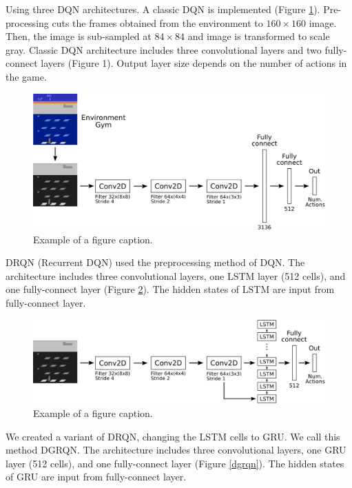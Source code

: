 \documentclass[conference]{IEEEtran}
\begin{document}
Using three DQN architectures. A classic DQN is implemented (Figure \ref{dqn}). Pre-processing cuts the frames obtained from the environment to $160\times160$ image. Then, the image is sub-sampled at $84\times84$ and image is transformed to scale gray. Classic DQN architecture includes three convolutional layers and two fully-connect layers (Figure 1). Output layer size depends on the number of actions in the game. 

\begin{figure}[htbp]
\centerline{\includegraphics[width=\linewidth]{images/DQN.png}}
\caption{Example of a figure caption.}
\label{dqn}
\end{figure}

DRQN (Recurrent DQN) used the preprocessing method of DQN. The architecture includes three convolutional layers, one LSTM layer (512 cells), and one fully-connect layer (Figure \ref{drqn}). The hidden states of LSTM are input from fully-connect layer.

\begin{figure}[htbp]
\centerline{\includegraphics[width=\linewidth]{images/DRQN.png}}
\caption{Example of a figure caption.}
\label{drqn}
\end{figure}

We created a variant of DRQN, changing the LSTM cells to GRU. We call this method DGRQN. The architecture includes three convolutional layers, one GRU layer (512 cells), and one fully-connect layer (Figure \ref{dgrqn}). The hidden states of GRU are input from fully-connect layer.
\end{document}
